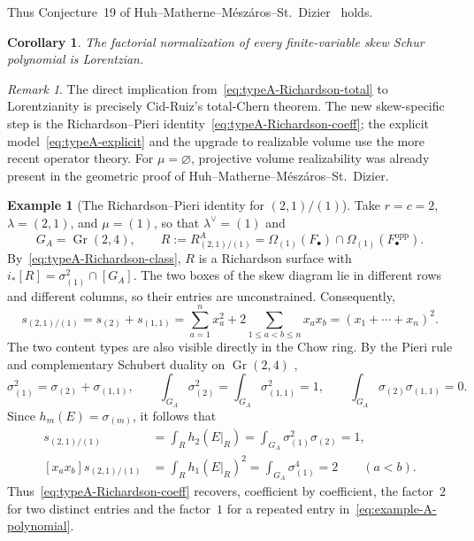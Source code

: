 \documentclass[11pt,a4paper,oneside]{amsart}
\numberwithin{equation}{section}
\newtheorem{corollary}[theorem]{Corollary}
\theoremstyle{definition}
\newtheorem{example}[theorem]{Example}
\theoremstyle{remark}
\newtheorem{remark}[theorem]{Remark}
\DeclareMathOperator{\Gr}{Gr}
\begin{document}
Thus Conjecture~19 of Huh--Matherne--M\'esz\'aros--St.~Dizier~\cite[Conjecture~19]{HMMSD22} holds.

\begin{corollary}\label{cor:conj19}
The factorial normalization of every finite-variable skew Schur polynomial is Lorentzian.
\end{corollary}

\begin{remark}
The direct implication from~\eqref{eq:typeA-Richardson-total} to Lorentzianity is precisely Cid-Ruiz's total-Chern theorem.  The new skew-specific step is the Richardson--Pieri identity~\eqref{eq:typeA-Richardson-coeff}; the explicit model~\eqref{eq:typeA-explicit} and the upgrade to realizable volume use the more recent operator theory.  For $\mu=\varnothing$, projective volume realizability was already present in the geometric proof of Huh--Matherne--M\'esz\'aros--St.~Dizier.
\end{remark}

\begin{example}[The Richardson--Pieri identity for $(2,1)/(1)$]
\label{ex:typeA-21-over-1}
Take $r=c=2$, $\lambda=(2,1)$, and $\mu=(1)$, so that
$\lambda^\vee=(1)$ and
\[
 G_A=\Gr(2,4),
 \qquad
 R:=R^A_{(2,1)/(1)}
 =\Omega_{(1)}(F_\bullet)\cap
  \Omega_{(1)}(F_\bullet^{\mathrm{opp}}).
\]
By~\eqref{eq:typeA-Richardson-class}, $R$ is a Richardson surface with
$i_*[R]=\sigma_{(1)}^2\cap[G_A]$.  The two boxes of the skew diagram lie in
different rows and different columns, so their entries are unconstrained.
Consequently,
\begin{equation}\label{eq:example-A-polynomial}
 s_{(2,1)/(1)}=s_{(2)}+s_{(1,1)}
 =\sum_{a=1}^n x_a^2+2\sum_{1\leq a<b\leq n}x_ax_b
 =(x_1+\cdots+x_n)^2.
\end{equation}
The two content types are also visible directly in the Chow ring.  By the
Pieri rule and complementary Schubert duality on $\Gr(2,4)$
\cite[Chapter~9]{FultonYT},
\[
 \sigma_{(1)}^2=\sigma_{(2)}+\sigma_{(1,1)},
 \qquad
 \int_{G_A}\sigma_{(2)}^2
 =\int_{G_A}\sigma_{(1,1)}^2=1,
 \qquad
 \int_{G_A}\sigma_{(2)}\sigma_{(1,1)}=0.
\]
Since $h_m(E)=\sigma_{(m)}$, it follows that
\begin{align*}
 [x_a^2]s_{(2,1)/(1)}
 &=\int_R h_2(E|_R)
   =\int_{G_A}\sigma_{(1)}^2\sigma_{(2)}=1,\\
 [x_ax_b]s_{(2,1)/(1)}
 &=\int_R h_1(E|_R)^2
   =\int_{G_A}\sigma_{(1)}^4=2
   \qquad(a<b).
\end{align*}
Thus~\eqref{eq:typeA-Richardson-coeff} recovers, coefficient by coefficient,
the factor~$2$ for two distinct entries and the factor~$1$ for a repeated
entry in~\eqref{eq:example-A-polynomial}.
\end{example}
\end{document}
